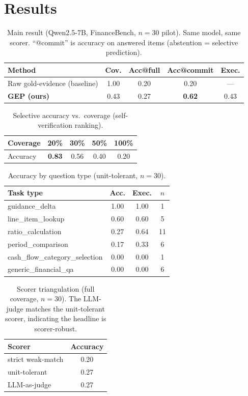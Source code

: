 \documentclass[sigconf,nonacm]{acmart}
\begin{document}
\section{Results}\label{sec:results}

\begin{table}[t]
\caption{Main result (Qwen2.5-7B, FinanceBench, $n{=}30$ pilot). Same model, same scorer.
``@commit'' is accuracy on answered items (abstention = selective prediction).}
\label{tab:main}
\begin{tabular}{lcccc}
\toprule
Method & Cov. & Acc@full & Acc@commit & Exec. \\
\midrule
Raw gold-evidence (baseline) & 1.00 & 0.20 & 0.20 & --- \\
\textbf{\textsc{GEP} (ours)} & 0.43 & 0.27 & \textbf{0.62} & 0.43 \\
\bottomrule
\end{tabular}
\end{table}

\begin{table}[t]
\caption{Selective accuracy vs.\ coverage (self-verification ranking).}
\label{tab:selective}
\begin{tabular}{lcccc}
\toprule
Coverage & 20\% & 30\% & 50\% & 100\% \\
\midrule
Accuracy & \textbf{0.83} & 0.56 & 0.40 & 0.20 \\
\bottomrule
\end{tabular}
\end{table}

\begin{table}[t]
\caption{Accuracy by question type (unit-tolerant, $n{=}30$).}
\label{tab:tasktype}
\begin{tabular}{lccc}
\toprule
Task type & Acc. & Exec. & $n$ \\
\midrule
guidance\_delta & 1.00 & 1.00 & 1 \\
line\_item\_lookup & 0.60 & 0.60 & 5 \\
ratio\_calculation & 0.27 & 0.64 & 11 \\
period\_comparison & 0.17 & 0.33 & 6 \\
cash\_flow\_category\_selection & 0.00 & 0.00 & 1 \\
generic\_financial\_qa & 0.00 & 0.00 & 6 \\
\bottomrule
\end{tabular}
\end{table}

\begin{table}[t]
\caption{Scorer triangulation (full coverage, $n{=}30$). The LLM-judge matches the
unit-tolerant scorer, indicating the headline is scorer-robust.}
\label{tab:scorers}
\begin{tabular}{lc}
\toprule
Scorer & Accuracy \\
\midrule
strict weak-match & 0.20 \\
unit-tolerant & 0.27 \\
LLM-as-judge & 0.27 \\
\bottomrule
\end{tabular}
\end{table}
\end{document}
